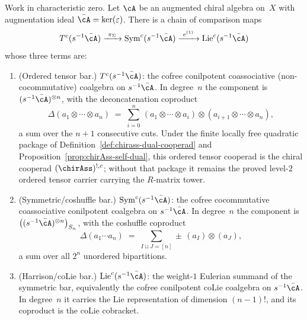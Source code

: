 \begin{theorem}\label{thm:three-bar-complexes}
Work in characteristic zero.
Let\/ $\cA$ be an augmented chiral algebra on\/~$X$ with
augmentation ideal\/ $\bar\cA = \ker(\varepsilon)$.
There is a chain of comparison maps
\begin{equation}\label{eq:three-bar-inclusions}
T^c(s^{-1}\bar\cA)
\xrightarrow{\ \pi_\Sigma\ }
\mathrm{Sym}^c(s^{-1}\bar\cA)
\xrightarrow{\ e^{(1)}\ }
\mathrm{Lie}^c(s^{-1}\bar\cA)
\end{equation}
whose three terms are:
\begin{enumerate}[label=\textup{(\roman*)}]
\item \textup{(Ordered tensor bar.)}
 $T^c(s^{-1}\bar\cA)$:
 the cofree conilpotent coassociative
 \textup{(}non-cocommutative\textup{)} coalgebra on
 $s^{-1}\bar\cA$.
 In degree~$n$ the component is
 $(s^{-1}\bar\cA)^{\otimes n}$,
 with the deconcatenation coproduct
 \[
 \Delta(a_1 \otimes \cdots \otimes a_n)
 \;=\;
 \sum_{i=0}^{n}\,
 (a_1 \otimes \cdots \otimes a_i)
 \otimes
 (a_{i+1} \otimes \cdots \otimes a_n),
 \]
 a sum over the\/ $n+1$ consecutive cuts.
 Under the finite locally free quadratic package of
 Definition~\ref{def:chirass-dual-cooperad} and
 Proposition~\ref{prop:chirAss-self-dual}, this ordered tensor
 cooperad is the chiral cooperad \((\chirAss)^{!,c}\); without that
 package it remains the proved level-$2$ ordered tensor carrier
 carrying the $R$-matrix tower.
\item \textup{(Symmetric/coshuffle bar.)}
 $\mathrm{Sym}^c(s^{-1}\bar\cA)$:
 the cofree cocommutative coassociative conilpotent
 coalgebra on $s^{-1}\bar\cA$.
 In degree~$n$ the component is
 $\bigl((s^{-1}\bar\cA)^{\otimes n}\bigr)_{S_n}$,
 with the coshuffle coproduct
 \[
 \Delta(a_1 \cdots a_n)
 \;=\;
 \sum_{I \sqcup J = [n]} \pm\, (a_I) \otimes (a_J),
 \]
 a sum over all\/ $2^n$ unordered bipartitions.
\item \textup{(Harrison/coLie bar.)}
 $\mathrm{Lie}^c(s^{-1}\bar\cA)$:
 the weight-$1$ Eulerian summand of the symmetric bar, equivalently
 the cofree conilpotent coLie coalgebra on $s^{-1}\bar\cA$.
 In degree~$n$ it carries the Lie representation
 of dimension $(n{-}1)!$, and its coproduct is the coLie cobracket.

\end{enumerate}
\end{theorem}
